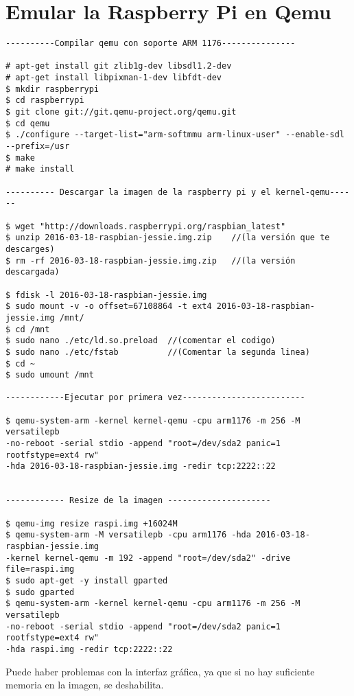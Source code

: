 \chapter{Emular la Raspberry Pi en Qemu}

\begin{verbatim}
----------Compilar qemu con soporte ARM 1176---------------

# apt-get install git zlib1g-dev libsdl1.2-dev
# apt-get install libpixman-1-dev libfdt-dev
$ mkdir raspberrypi
$ cd raspberrypi
$ git clone git://git.qemu-project.org/qemu.git
$ cd qemu
$ ./configure --target-list="arm-softmmu arm-linux-user" --enable-sdl 
--prefix=/usr
$ make
# make install

---------- Descargar la imagen de la raspberry pi y el kernel-qemu------

$ wget "http://downloads.raspberrypi.org/raspbian_latest"
$ unzip 2016-03-18-raspbian-jessie.img.zip    //(la versión que te descarges)
$ rm -rf 2016-03-18-raspbian-jessie.img.zip	  //(la versión descargada)

$ fdisk -l 2016-03-18-raspbian-jessie.img 
$ sudo mount -v -o offset=67108864 -t ext4 2016-03-18-raspbian-jessie.img /mnt/
$ cd /mnt
$ sudo nano ./etc/ld.so.preload  //(comentar el codigo)
$ sudo nano ./etc/fstab 	 	 //(Comentar la segunda linea)
$ cd ~
$ sudo umount /mnt

------------Ejecutar por primera vez-------------------------

$ qemu-system-arm -kernel kernel-qemu -cpu arm1176 -m 256 -M versatilepb 
-no-reboot -serial stdio -append "root=/dev/sda2 panic=1 rootfstype=ext4 rw" 
-hda 2016-03-18-raspbian-jessie.img -redir tcp:2222::22


------------ Resize de la imagen ---------------------

$ qemu-img resize raspi.img +16024M 
$ qemu-system-arm -M versatilepb -cpu arm1176 -hda 2016-03-18-raspbian-jessie.img 
-kernel kernel-qemu -m 192 -append "root=/dev/sda2" -drive file=raspi.img
$ sudo apt-get -y install gparted
$ sudo gparted
$ qemu-system-arm -kernel kernel-qemu -cpu arm1176 -m 256 -M versatilepb 
-no-reboot -serial stdio -append "root=/dev/sda2 panic=1 rootfstype=ext4 rw"
-hda raspi.img -redir tcp:2222::22
\end{verbatim}

Puede haber problemas con la interfaz gráfica, ya que si no hay suficiente memoria en la imagen, se deshabilita. 
